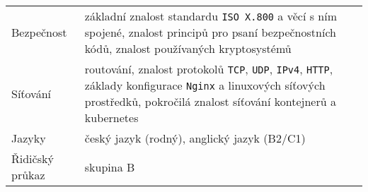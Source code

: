 \documentclass[a4paper,12pt]{article}
\begin{document}
\begin{tabularx}{\linewidth}{ @{}l X }
Bezpečnost \rule{0pt}{3ex} &
základní znalost standardu \texttt{ISO X.800} a věcí s ním spojené, znalost principů pro psaní bezpečnostních kódů, znalost používaných kryptosystémů \\

Síťování \rule{0pt}{3ex} &
routování, znalost protokolů \texttt{TCP}, \texttt{UDP}, \texttt{IPv4}, \texttt{HTTP}, základy konfigurace \texttt{Nginx} a linuxových síťových prostředků, pokročilá znalost síťování kontejnerů a kubernetes\\

Jazyky \rule{0pt}{3ex} &
český jazyk (rodný), anglický jazyk (B2/C1)\\

Řidičský průkaz \rule{0pt}{3ex} &
skupina B\\
\end{tabularx}



\vfill
{}
\end{document}
